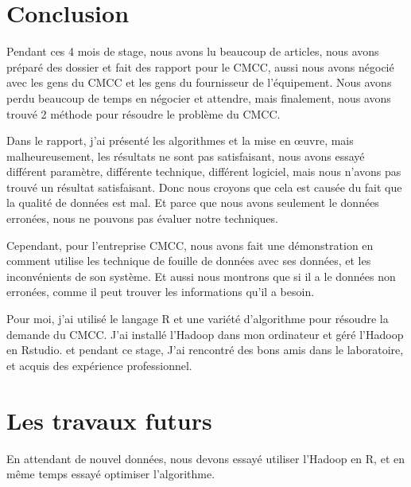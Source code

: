 \section*{Conclusion}

Pendant ces 4 mois de stage, nous avons lu beaucoup de articles, nous avons préparé des dossier et fait des rapport pour le CMCC, aussi nous avons négocié avec les gens du CMCC et les gens du fournisseur de l'équipement. Nous avons perdu beaucoup de temps en négocier et attendre, mais finalement, nous avons trouvé 2 méthode pour résoudre le problème du CMCC.

Dans le rapport, j'ai présenté les algorithmes et la mise en \oe uvre, mais malheureusement, les résultats ne sont pas satisfaisant, nous avons essayé différent paramètre, différente technique, différent logiciel, mais nous n'avons pas trouvé un résultat satisfaisant. Donc nous croyons que cela est causée du fait que la qualité de données est mal. Et parce que nous avons seulement le données erronées, nous ne pouvons pas évaluer notre techniques.

Cependant, pour l'entreprise CMCC, nous avons fait une démonstration en comment utilise les technique de fouille de données avec ses données, et les inconvénients de son système. Et aussi nous montrons que si il a le données non erronées, comme il peut trouver les informations qu'il a besoin.

Pour moi, j'ai utilisé le langage R et une variété d'algorithme pour résoudre la demande du CMCC. J'ai installé l'Hadoop dans mon ordinateur et géré l'Hadoop en Rstudio. et pendant ce stage, J'ai rencontré des bons amis dans le laboratoire, et acquis des expérience professionnel.

\section*{Les travaux futurs}

En attendant de nouvel données, nous devons essayé utiliser l'Hadoop en R, et en même temps essayé optimiser l'algorithme.
